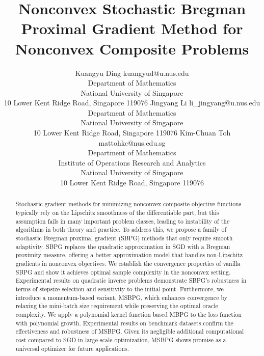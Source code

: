 \documentclass[twoside,11pt]{article}
\begin{document}
\title{Nonconvex Stochastic Bregman Proximal Gradient Method for Nonconvex Composite Problems}

\author{\name Kuangyu Ding \email  kuangyud@u.nus.edu \\
       \addr Department of Mathematics\\
       National University of Singapore\\
       10 Lower Kent Ridge Road, Singapore 119076
       \AND
       \name Jingyang Li \email  li\_jingyang@u.nus.edu \\
       \addr Department of Mathematics\\
       National University of Singapore\\
       10 Lower Kent Ridge Road, Singapore 119076
       \AND
       \name Kim-Chuan Toh \email  mattohkc@nus.edu.sg \\
       \addr Department of Mathematics \\ Institute of Operations Research and Analytics\\
       National University of Singapore\\
       10 Lower Kent Ridge Road, Singapore 119076}


\editor{}


\maketitle

\begin{abstract}%
Stochastic gradient methods for minimizing nonconvex composite objective functions typically rely on the Lipschitz smoothness of the differentiable part, but this assumption fails in many important problem classes, leading to instability of the algorithms in both theory and practice. To address this, we propose a family of stochastic Bregman proximal gradient (SBPG) methods that only require smooth adaptivity. SBPG replaces the quadratic approximation in SGD with a Bregman proximity measure, offering a better approximation model that handles non-Lipschitz gradients in nonconvex objectives. We establish the convergence properties of vanilla SBPG and show it achieves optimal sample complexity in the nonconvex setting. Experimental results on quadratic inverse problems demonstrate SBPG's robustness in terms of stepsize selection and sensitivity to the initial point. Furthermore, we introduce a momentum-based variant, MSBPG, which enhances convergence by relaxing the mini-batch size requirement while preserving the optimal oracle complexity. We apply a polynomial kernel function based MBPG to the loss function with polynomial growth. Experimental results on benchmark datasets confirm the effectiveness and robustness of MSBPG. Given its negligible additional computational cost compared to SGD in large-scale optimization, MSBPG shows promise as a universal optimizer for future applications.

\end{abstract}
\end{document}

